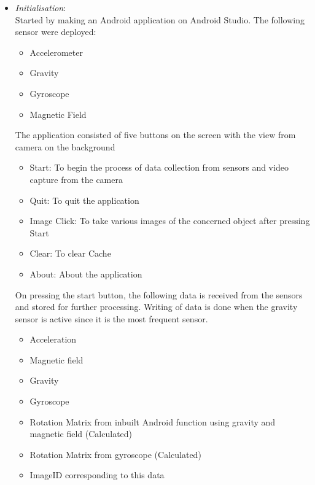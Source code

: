 \documentclass{article}
\begin{document}
		\begin{itemize}
			\item \textit{Initialisation}:\\ Started by making an Android application on Android Studio. The following sensor were deployed:
				\begin{itemize}
				\item Accelerometer
				\item Gravity
				\item Gyroscope
				\item Magnetic Field
				\end{itemize} 
			The application consisted of five buttons on the screen with the view from camera on the background
				\begin{itemize}
				\item Start: To begin the process of data collection from sensors and video capture from the camera
				\item Quit: To quit the application
				\item Image Click: To take various images of the concerned object after pressing Start
				\item Clear: To clear Cache
				\item About: About the application
				\end{itemize}
			On pressing the start button, the following data is received from the sensors and stored for further processing. Writing of data is done when the gravity sensor is active since it is the most frequent sensor.
				\begin{itemize}
				\item Acceleration
				\item Magnetic field
				\item Gravity
				\item Gyroscope
				\item Rotation Matrix from inbuilt Android function using gravity and magnetic field (Calculated)
				\item Rotation Matrix from gyroscope (Calculated)
				\item ImageID corresponding to this data
				\end{itemize}


\end{itemize}
\end{document}

